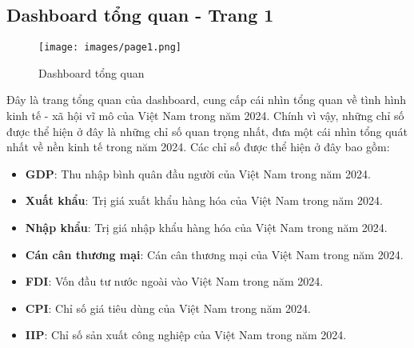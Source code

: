 \documentclass[a4paper]{report}
\begin{document}
{{\subsection{Dashboard tổng quan - Trang 1}

\begin{figure}[H]
    \centering
    \texttt{[image: images/page1.png]}
    \caption{Dashboard tổng quan}
\end{figure}

Đây là trang tổng quan của dashboard, cung cấp cái nhìn tổng quan về tình hình kinh tế - xã hội vĩ mô của Việt Nam trong năm 2024. Chính vì vậy, những chỉ số được thể hiện ở đây là những chỉ số quan trọng nhất, đưa một cái nhìn tổng quát nhất về nền kinh tế trong năm 2024. Các chỉ số được thể hiện ở đây bao gồm:
\begin{itemize}
    \item \textbf{GDP}: Thu nhập bình quân đầu người của Việt Nam trong năm 2024.
    \item \textbf{Xuất khẩu}: Trị giá xuất khẩu hàng hóa của Việt Nam trong năm 2024.
    \item \textbf{Nhập khẩu}: Trị giá nhập khẩu hàng hóa của Việt Nam trong năm 2024.
    \item \textbf{Cán cân thương mại}: Cán cân thương mại của Việt Nam trong năm 2024.
    \item \textbf{FDI}: Vốn đầu tư nước ngoài vào Việt Nam trong năm 2024.
    \item \textbf{CPI}: Chỉ số giá tiêu dùng của Việt Nam trong năm 2024.
    \item \textbf{IIP}: Chỉ số sản xuất công nghiệp của Việt Nam trong năm 2024.
\end{itemize}

}}
\end{document}
